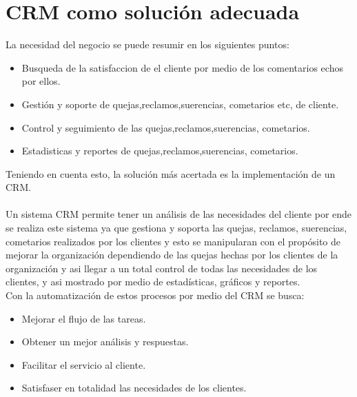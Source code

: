 \section{CRM como soluci\'on adecuada}
%
La necesidad del negocio se puede resumir en los siguientes puntos:%
%
\begin{itemize}
\item Busqueda de la satisfaccion de el cliente por medio de los comentarios echos por ellos.
\item Gesti\'on y soporte de quejas,reclamos,suerencias, cometarios etc, de cliente.
\item Control y seguimiento de las quejas,reclamos,suerencias, cometarios.
\item Estadisticas y reportes de quejas,reclamos,suerencias, cometarios.
\end{itemize}
%
Teniendo en cuenta esto, la soluci\'on m\'as acertada es la implementaci\'on de un CRM.%
\\%
\\%
Un sistema CRM permite tener un an\'alisis de las necesidades del cliente por ende se realiza este sistema ya que gestiona y soporta las quejas, reclamos, suerencias, cometarios realizados por los clientes y esto se manipularan con el prop\'osito de mejorar la organizaci\'on dependiendo de las quejas hechas por los clientes de la organizaci\'on y asi llegar a un total control de todas las necesidades de los clientes, y asi mostrado por medio de estad\'isticas, gr\'aficos y reportes.
\\%
Con la automatizaci\'on  de estos procesos por medio del CRM se busca:
%
\begin{itemize}
	\item Mejorar el flujo de las tareas. 
	\item Obtener un mejor an\'alisis y respuestas.
	\item Facilitar el servicio al cliente.
	\item Satisfaser en totalidad las necesidades de los clientes.
\end{itemize}
%


